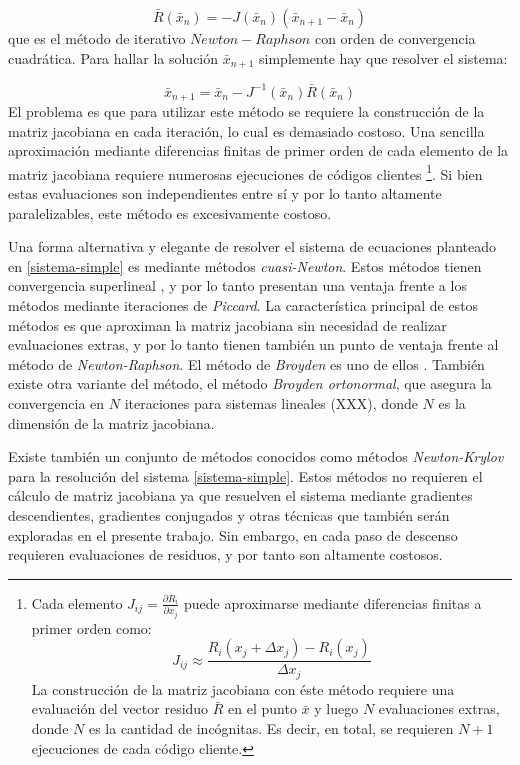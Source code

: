 \begin{equation}
\bar{R}(\bar{x}_n) = -J(\bar{x}_n)(\bar{x}_{n+1}-\bar{x}_n)
\end{equation}
que es el método de iterativo $Newton-Raphson$ con orden de convergencia cuadrática. Para hallar la solución $\bar{x}_{n+1}$ simplemente hay que resolver el sistema:

\begin{equation}
\bar{x}_{n+1} = \bar{x}_{n} -J^{-1}(\bar{x}_n)\bar{R}(\bar{x}_n)
\end{equation}
El problema es que para utilizar este método se requiere la construcción de la matriz jacobiana en cada iteración, lo cual es demasiado costoso.
Una sencilla aproximación mediante diferencias finitas de primer orden de cada elemento de la matriz jacobiana requiere numerosas ejecuciones de códigos clientes
\footnote{
Cada elemento $J_{ij}=\frac{\partial R_i}{\partial x_j}$ puede aproximarse mediante diferencias finitas a primer orden como:
\begin{equation}
J_{ij} \approx \frac{R_i(x_j + \Delta x_j) - R_i(x_j)}{\Delta x_j}
\end{equation}
La construcción de la matriz jacobiana con éste método requiere una evaluación del vector residuo $\bar{R}$ en el punto $\bar{x}$ y luego $N$ evaluaciones extras, donde $N$ es la cantidad de incógnitas. Es decir, en total, se requieren $N+1$ ejecuciones de cada código cliente.
}.
Si bien estas evaluaciones son independientes entre sí y por lo tanto altamente paralelizables, este método es excesivamente costoso.

Una forma alternativa y elegante de resolver el sistema de ecuaciones planteado en \ref{sistema-simple} es mediante métodos \textit{cuasi-Newton}.
Estos métodos tienen convergencia superlineal \cite{broyden-on}, y por lo tanto presentan una ventaja frente a los métodos mediante iteraciones de \textit{Piccard}. 
La característica principal de estos métodos es que aproximan la matriz jacobiana sin necesidad de realizar evaluaciones extras, y por lo tanto tienen también un punto de ventaja frente al método de \textit{Newton-Raphson}.
El método de \textit{Broyden} es uno de ellos \cite{broyden}.
También existe otra variante del método, el método \textit{Broyden ortonormal}, que asegura la convergencia en $N$ iteraciones para sistemas lineales (XXX), donde $N$ es la dimensión de la matriz jacobiana.

Existe también un conjunto de métodos conocidos como métodos \textit{Newton-Krylov} para la resolución del sistema \ref{sistema-simple}. Estos métodos no requieren el cálculo de matriz jacobiana ya que resuelven el sistema mediante gradientes descendientes, gradientes conjugados y otras técnicas que también serán exploradas en el presente trabajo. Sin embargo, en cada paso de descenso requieren evaluaciones de residuos, y por tanto son altamente costosos.

